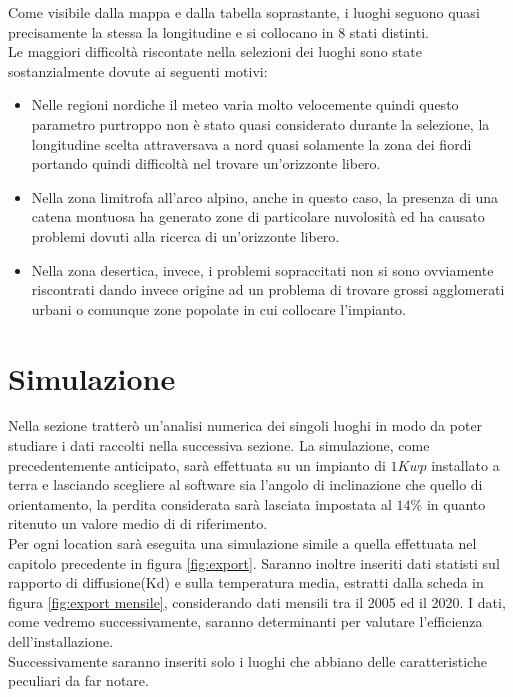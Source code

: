 Come visibile dalla mappa e dalla tabella soprastante, i luoghi seguono quasi precisamente la stessa la longitudine e si collocano in 8 stati distinti.\\
Le maggiori difficoltà riscontate nella selezioni dei luoghi sono state sostanzialmente dovute ai seguenti motivi:
\begin{itemize}
    \item Nelle regioni nordiche il meteo varia molto velocemente quindi questo parametro purtroppo non è stato quasi considerato durante la selezione, la longitudine scelta attraversava a nord quasi solamente la zona dei fiordi portando quindi difficoltà nel trovare un'orizzonte libero.
    \item Nella zona limitrofa all'arco alpino, anche in questo caso, la presenza di una catena montuosa ha generato zone di particolare nuvolosità ed ha causato problemi dovuti alla ricerca di un'orizzonte libero.
    \item Nella zona desertica, invece, i problemi sopraccitati non si sono ovviamente riscontrati dando invece origine ad un problema di trovare grossi agglomerati urbani o comunque zone popolate in cui collocare l'impianto.
\end{itemize}
\noindent
\section{Simulazione}
Nella sezione tratterò un'analisi numerica dei singoli luoghi in modo da poter studiare i dati raccolti nella successiva sezione.
La simulazione, come precedentemente anticipato, sarà effettuata su un impianto di {\large$1Kwp$} installato a terra e lasciando scegliere al software sia l'angolo di inclinazione che quello di orientamento, la perdita considerata sarà lasciata impostata al {\large$14\%$} in quanto ritenuto un valore medio di di riferimento.\\
Per ogni location sarà eseguita una simulazione simile a quella effettuata nel capitolo precedente in figura \ref{fig:export}.
Saranno inoltre inseriti dati statisti sul rapporto di diffusione(Kd) e sulla temperatura media, estratti dalla scheda in figura \ref{fig:export mensile}, considerando dati mensili tra il 2005 ed il 2020. I dati, come vedremo successivamente, saranno determinanti per valutare l'efficienza dell'installazione.\\
Successivamente saranno inseriti solo i luoghi che abbiano delle caratteristiche peculiari da far notare.\\
\newpage
